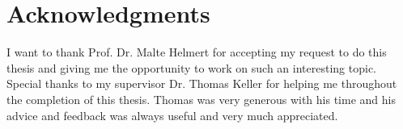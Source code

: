 \chapter{Acknowledgments}
I want to thank Prof. Dr. Malte Helmert for accepting my request to do this thesis and giving me the opportunity to work on such an interesting topic. Special thanks to my supervisor Dr. Thomas Keller for helping me throughout the completion of this thesis. Thomas was very generous with his time and his advice and feedback was always useful and very much appreciated.
